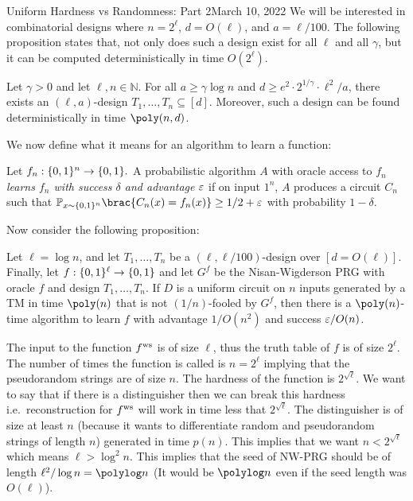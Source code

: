 \begin{lecture}{8}{Uniform Hardness vs Randomness: Part 2}{March 10, 2022}
We will be interested in combinatorial designs where $n = 2^\ell$, $d =
O(\ell)$, and $a = \ell/100$. The following proposition states that, not only does such a design exist for all $\ell$ and all $\gamma$, but it can be computed deterministically in time $O(2^\ell)$.

\begin{proposition} \label{prop:comb-design}
	Let $\gamma > 0 $ and let $\ell, n \in \mathbb{N}$. For all $a \ge \gamma
	\log{n}$ and $d \ge e^2 \cdot 2^{1/\gamma} \cdot \ell^2/a$, there exists an
	$(\ell, a)$-design $T_1, \dots, T_n \subseteq [d]$. Moreover, such a design
	can be found deterministically in time $\poly(n, d)$.
\end{proposition}

We now define what it means for an algorithm to learn a function:
\begin{definition}
	Let $f_n : \{0, 1\}^n \to \{0, 1\}.$ A probabilistic algorithm $A$ with
	oracle access to $f_n$ \emph{learns $f_n$ with success $\delta$ and advantage
		$\varepsilon$} if on input $1^n$, $A$ produces a circuit $C_n$ such that
	$\Pr_{x \sim \{0, 1\}^n} \brac{C_n(x) = f_n(x)} \geq 1/2 + \eps$ with
	probability $1 - \delta$.
\end{definition}

Now consider the following proposition:

\begin{proposition}\label{prop:learning-func}
	Let $\ell = \log{n}$, and let $T_1, \dots, T_n$ be
	a $(\ell, \ell/100)$-design over $[d=O(\ell)]$. Finally, let $f :
	\{0,1\}^\ell \to \{0, 1\}$ and let $G^f$ be the Nisan-Wigderson PRG with
	oracle $f$ and design $T_1, \dots, T_n$. If $D$ is a uniform circuit on $n$
	inputs generated by a TM in time $\poly(n)$ that is not $(1/n)$-fooled by $G^f$, then
	there is a $\poly(n)$-time algorithm to learn $f$ with advantage $1/O(n^2)$ and
	success $\varepsilon/O(n)$.
\end{proposition}

The input to the function $ f^{\text{ws}} $ is of size $\ell$, thus the truth table of $f$ is of size $2^{\ell}$. The number of times the function is called is $n = 2^{\ell}$ implying that the pseudorandom strings are of size $n$.
The hardness of the function is $2^{\sqrt{\ell}}$. We want to say that if there is a distinguisher then we can break this hardness i.e.\ reconstruction for $ f^{\text{ws}} $ will work in time less that $2^{\sqrt{\ell}}$.
The distinguisher is of size at least $n$ (because it wants to differentiate random and pseudorandom strings of length $n$) generated in time $p(n)$. This implies that we want $n < 2^{\sqrt{\ell}}$ which means $\ell > \log^2 n$. This implies that the seed of NW-PRG should be of length $\ell^2/\log n = \polylog n$ (It would be $\polylog n$ even if the seed length was $O(\ell)$).


\end{lecture}
